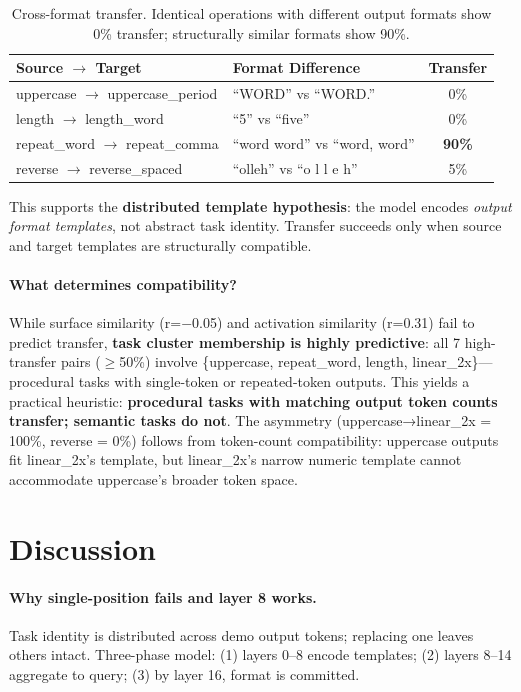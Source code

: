 \documentclass[11pt]{article}
\begin{document}
\begin{table}[t]
\caption{Cross-format transfer. Identical operations with different output formats show 0\% transfer; structurally similar formats show 90\%.}
\label{tab:format}
\centering
\small
\begin{tabular}{@{}llc@{}}
\toprule
Source $\to$ Target & Format Difference & Transfer \\
\midrule
uppercase $\to$ uppercase\_period & ``WORD'' vs ``WORD.'' & 0\% \\
length $\to$ length\_word & ``5'' vs ``five'' & 0\% \\
repeat\_word $\to$ repeat\_comma & ``word word'' vs ``word, word'' & \textbf{90\%} \\
reverse $\to$ reverse\_spaced & ``olleh'' vs ``o l l e h'' & 5\% \\
\bottomrule
\end{tabular}
\end{table}

This supports the \textbf{distributed template hypothesis}: the model encodes \emph{output format templates}, not abstract task identity. Transfer succeeds only when source and target templates are structurally compatible.

\paragraph{What determines compatibility?} While surface similarity (r=$-$0.05) and activation similarity (r=0.31) fail to predict transfer, \textbf{task cluster membership is highly predictive}: all 7 high-transfer pairs ($\geq$50\%) involve \{uppercase, repeat\_word, length, linear\_2x\}---procedural tasks with single-token or repeated-token outputs. This yields a practical heuristic: \textbf{procedural tasks with matching output token counts transfer; semantic tasks do not}. The asymmetry (uppercase→linear\_2x = 100\%, reverse = 0\%) follows from token-count compatibility: uppercase outputs fit linear\_2x's template, but linear\_2x's narrow numeric template cannot accommodate uppercase's broader token space.

\section{Discussion}

\paragraph{Why single-position fails and layer 8 works.}
Task identity is distributed across demo output tokens; replacing one leaves others intact. Three-phase model: (1) layers 0--8 encode templates; (2) layers 8--14 aggregate to query; (3) by layer 16, format is committed.
\end{document}
